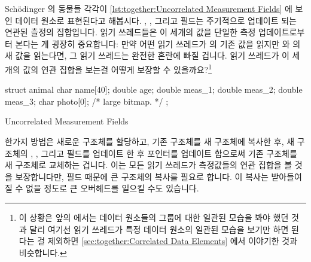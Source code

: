 Sch\"odinger 의 동물들 각각이
\cref{lst:together:Uncorrelated Measurement Fields} 에 보인 데이터 원소로
표현된다고 해봅시다.
, , 그리고  필드는 주기적으로 업데이트 되는
연관된 츨정의 집합입니다.
읽기 쓰레드들은 이 세개의 값을 단일한 측정 업데이트로부터 본다는 게 굉장히
중요합니다: 만약 어떤 읽기 쓰레드가  의 기존 값을 읽지만 
와  의 새 값을 읽는다면, 그 읽기 쓰레드는 완전한 혼란에 빠질 겁니다.
읽기 쓰레드가 이 세개의 값의 연관 집합을 보는걸 어떻게 보장할 수
있을까요?\footnote{
	이 상황은
	앞의  에서는 데이터
	원소들의 그룹에 대한 일관된 모습을 봐야 했던 것과 달리 여기선 읽기
	쓰레드가 특정 데이터 원소의 일관된 모습을 보기만 하면 된다는 걸
	제외하면
	\cref{sec:together:Correlated Data Elements} 에서 이야기한 것과
	비슷합니다.}

\iffalse

Suppose that each of Sch\"odinger's animals is represented by the
data element shown in
\cref{lst:together:Uncorrelated Measurement Fields}.
The \co{meas_1}, \co{meas_2}, and \co{meas_3} fields are a set
of correlated measurements that are updated periodically.
It is critically important that readers see these three values from
a single measurement update: If a reader sees an old value of
\co{meas_1} but new values of \co{meas_2} and \co{meas_3}, that
reader will become fatally confused.
How can we guarantee that readers will see coordinated sets of these
three values?\footnote{
	This situation is similar to that described in
	\cref{sec:together:Correlated Data Elements},
	except that here readers need only see a consistent view of a
	given single data element, not the consistent view of a
	group of data elements that was required in that earlier
	\lcnamecref{sec:together:Correlated Data Elements}.}

\fi

\begin{listing}[tbp]
\begin{VerbatimL}[tabsize=8]
struct animal {
	char name[40];
	double age;
	double meas_1;
	double meas_2;
	double meas_3;
	char photo[0]; /* large bitmap. */
};
\end{VerbatimL}
\caption{Uncorrelated Measurement Fields}
\label{lst:together:Uncorrelated Measurement Fields}
\end{listing}

한가지 방법은 새로운  구조체를 할당하고, 기존 구조체를 새 구조체에
복사한 후, 새 구조체의 , , 그리고  필드를
업데이트 한 후 포인터를 업데이트 함으로써 기존 구조체를 새 구조체로 교체하는
겁니다.
이는 모든 읽기 쓰레드가 측정값들의 연관 집합을 볼 것을 보장합니다만,
 필드 때문에 큰 구조체의 복사를 필요로 합니다.
이 복사는 받아들여질 수 없을 정도로 큰 오버헤드를 일으킬 수도 있습니다.

